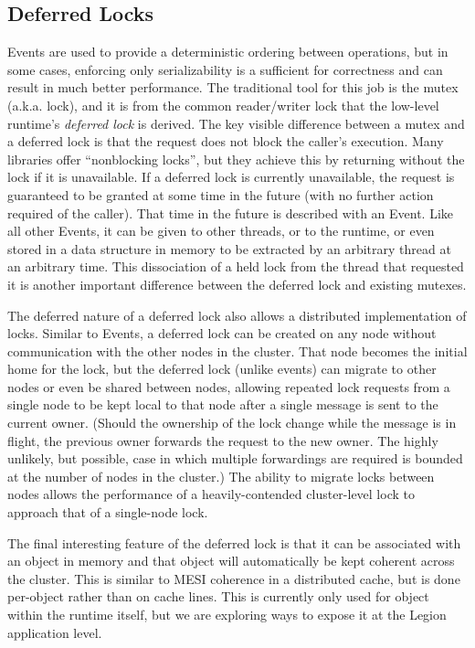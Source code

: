 \subsection{Deferred Locks}

Events are used to provide a deterministic ordering between operations, but in
some cases, enforcing only serializability is a sufficient for correctness and
can result in much better performance.  The traditional tool for this job is
the mutex (a.k.a. lock), and it is from the common reader/writer lock that
the low-level runtime's \emph{deferred lock} is derived.  The key visible 
difference between a mutex and a deferred lock is that the request does not
block the caller's execution.  Many libraries offer ``nonblocking locks'', but
they achieve this by returning without the lock if it is unavailable.  If
a deferred lock is currently unavailable, the request is guaranteed to be
granted at some time in the future (with no further action required of the 
caller).  That time in the future is described with an Event.  Like all other
Events, it can be given to other threads, or to the runtime, or even stored
in a data structure in memory to be extracted by an arbitrary thread at an 
arbitrary time.  This dissociation of a held lock from the thread that
requested it is another important difference between the deferred lock and
existing mutexes.

The deferred nature of a deferred lock also allows a distributed implementation
of locks.  Similar to Events, a deferred lock can be created on any node
without communication with the other nodes in the cluster.  That node becomes
the initial home for the lock, but the deferred lock (unlike events) can 
migrate to other nodes or even be shared between nodes, allowing repeated
lock requests from a single node to be kept local to that node after a single
message is sent to the current owner.  (Should the ownership of the lock change
while the message is in flight, the previous owner forwards the request to
the new owner.  The highly unlikely, but possible, case in which multiple 
forwardings are required is bounded at the number of nodes in the cluster.)
The ability to migrate locks between nodes allows the performance of a
heavily-contended cluster-level lock to approach that of a single-node lock.

The final interesting feature of the deferred lock is that it can be associated
with an object in memory and that object will automatically be kept coherent
across the cluster.  This is similar to MESI coherence in a distributed cache,
but is done per-object rather than on cache lines.  This is currently only 
used for object within the runtime itself, but we are exploring ways to expose
it at the Legion application level.

